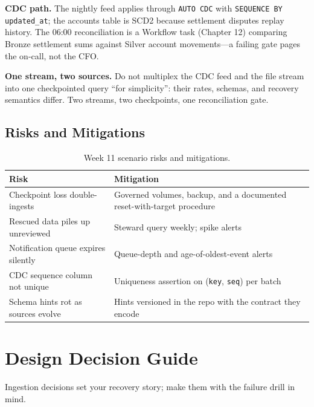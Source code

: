 \textbf{CDC path.} The nightly feed applies through \texttt{AUTO CDC} with \texttt{SEQUENCE BY updated\_at}; the accounts table is SCD2 because settlement disputes replay history. The 06:00 reconciliation is a Workflow task (Chapter 12) comparing Bronze settlement sums against Silver account movements---a failing gate pages the on-call, not the CFO.

\begin{pitfall}
\textbf{One stream, two sources.} Do not multiplex the CDC feed and the file stream into one checkpointed query ``for simplicity'': their rates, schemas, and recovery semantics differ. Two streams, two checkpoints, one reconciliation gate.
\end{pitfall}

\subsection{Risks and Mitigations}
\begin{table}[H]
\centering
\small
\begin{tabular}{@{}p{4.6cm}p{7.6cm}@{}}
\toprule
\textbf{Risk} & \textbf{Mitigation} \\
\midrule
Checkpoint loss double-ingests & Governed volumes, backup, and a documented reset-with-target procedure \\
Rescued data piles up unreviewed & Steward query weekly; spike alerts \\
Notification queue expires silently & Queue-depth and age-of-oldest-event alerts \\
CDC sequence column not unique & Uniqueness assertion on (\texttt{key}, \texttt{seq}) per batch \\
Schema hints rot as sources evolve & Hints versioned in the repo with the contract they encode \\
\bottomrule
\end{tabular}
\caption{Week 11 scenario risks and mitigations.}
\label{tab:ch11-risks}
\end{table}

\section{Design Decision Guide}
%
Ingestion decisions set your recovery story; make them with the failure drill in mind.

